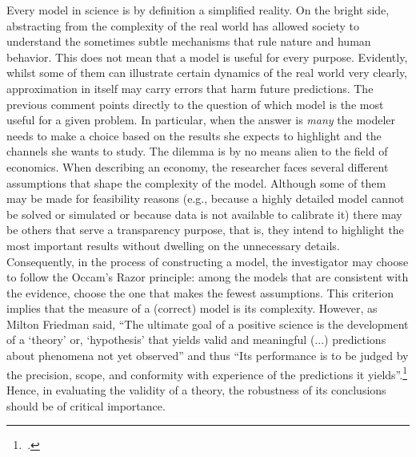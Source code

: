 \documentclass[english, a4paper, 12pt]{article}
\begin{document}
Every model in science is by definition a simplified reality. On the bright side, abstracting from the complexity of the real world has allowed society to understand the sometimes subtle mechanisms that rule nature and human behavior. This does not mean that a model is useful for every purpose. Evidently, whilst some of them can illustrate certain dynamics of the real world very clearly, approximation in itself may carry errors that harm future predictions. The previous comment points directly to the question of which model is the most useful for a given problem. In particular, when the answer is \textit{many} the modeler needs to make a choice based on the results she expects to highlight and the channels she wants to study. The dilemma is by no means alien to the field of economics. When describing an economy, the researcher faces several different assumptions that shape the complexity of the model. Although some of them may be made for feasibility reasons (e.g., because a highly detailed model cannot be solved or simulated or because data is not available to calibrate it) there may be others that serve a transparency purpose, that is, they intend to highlight the most important results without dwelling on the unnecessary details. Consequently, in the process of constructing a model, the investigator may choose to follow the Occam's Razor principle: among the models that are consistent with the evidence, choose the one that makes the fewest assumptions. This criterion implies that the measure of a (correct) model is its complexity. However, as Milton Friedman said, ``The ultimate goal of a positive science is the development of a `theory' or, `hypothesis' that yields valid and meaningful (...) predictions about phenomena not yet observed'' and thus ``Its performance is to be judged by the precision, scope, and conformity with experience of the predictions it yields''.\footnote{\,\cite{FriedmanPositive}.} Hence, in evaluating the validity of a theory, the robustness of its conclusions should be of critical importance.
\end{document}
